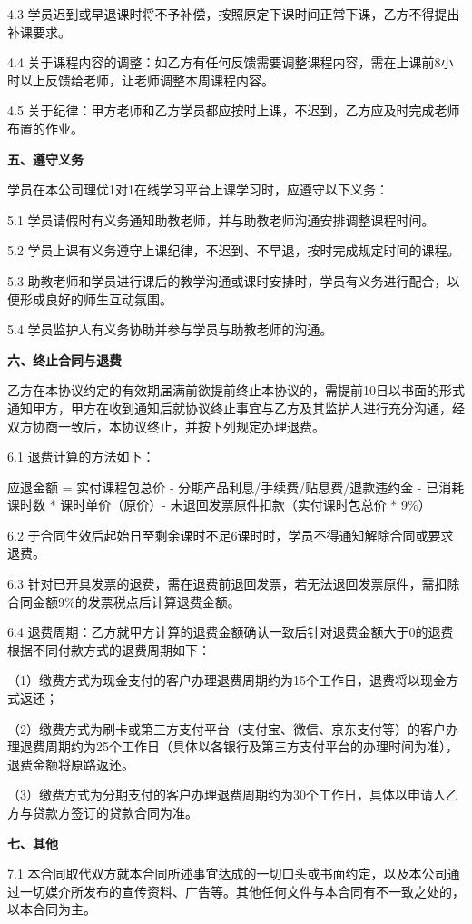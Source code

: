 \documentclass {ctexart}
\begin{document}
4.3	学员迟到或早退课时将不予补偿，按照原定下课时间正常下课，乙方不得提出补课要求。

4.4	关于课程内容的调整：如乙方有任何反馈需要调整课程内容，需在上课前8小时以上反馈给老师，让老师调整本周课程内容。

4.5	关于纪律：甲方老师和乙方学员都应按时上课，不迟到，乙方应及时完成老师布置的作业。


\textbf{五、遵守义务}

学员在本公司理优1对1在线学习平台上课学习时，应遵守以下义务：

5.1	学员请假时有义务通知助教老师，并与助教老师沟通安排调整课程时间。

5.2	学员上课有义务遵守上课纪律，不迟到、不早退，按时完成规定时间的课程。

5.3	助教老师和学员进行课后的教学沟通或课时安排时，学员有义务进行配合，以便形成良好的师生互动氛围。

5.4	学员监护人有义务协助并参与学员与助教老师的沟通。

\textbf{六、终止合同与退费}

乙方在本协议约定的有效期届满前欲提前终止本协议的，需提前10日以书面的形式通知甲方，甲方在收到通知后就协议终止事宜与乙方及其监护人进行充分沟通，经双方协商一致后，本协议终止，并按下列规定办理退费。

6.1	退费计算的方法如下：

应退金额 = 实付课程包总价 - 分期产品利息/手续费/贴息费/退款违约金 - 已消耗课时数 * 课时单价（原价）- 未退回发票原件扣款（实付课时包总价 * 9\%）

6.2	于合同生效后起始日至剩余课时不足6课时时，学员不得通知解除合同或要求退费。

6.3	针对已开具发票的退费，需在退费前退回发票，若无法退回发票原件，需扣除合同金额9\%的发票税点后计算退费金额。

6.4	退费周期：乙方就甲方计算的退费金额确认一致后针对退费金额大于0的退费根据不同付款方式的退费周期如下：

（1）缴费方式为现金支付的客户办理退费周期约为15个工作日，退费将以现金方式返还；

（2）缴费方式为刷卡或第三方支付平台（支付宝、微信、京东支付等）的客户办理退费周期约为25个工作日（具体以各银行及第三方支付平台的办理时间为准），退费金额将原路返还。

（3）缴费方式为分期支付的客户办理退费周期约为30个工作日，具体以申请人乙方与贷款方签订的贷款合同为准。

\textbf{七、其他}

7.1	本合同取代双方就本合同所述事宜达成的一切口头或书面约定，以及本公司通过一切媒介所发布的宣传资料、广告等。其他任何文件与本合同有不一致之处的，以本合同为主。
\end{document}

